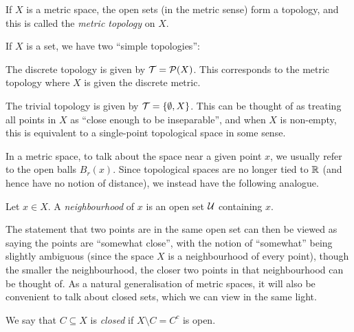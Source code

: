 \documentclass[11pt]{article}
\begin{document}
\begin{example}
    \begin{enum2}
        \item If $X$ is a metric space, the open sets (in the metric sense) form a topology, and this is called the \emph{metric topology} on $X$.
        \item If $X$ is a set, we have two ``simple topologies'':
        \begin{enum2}
            \item The discrete topology is given by $\mathcal{T} = \mathcal{P}(X)$. This corresponds to the metric topology where $X$ is given the discrete metric.
            \item The trivial topology is given by $\mathcal{T} = \left\{  \emptyset, X  \right\}$. This can be thought of as treating all points in $X$ as ``close enough to be inseparable'', and when $X$ is non-empty, this is equivalent to a single-point topological space in some sense.
        \end{enum2}
    \end{enum2}
\end{example}

In a metric space, to talk about the space near a given point $x$, we usually refer to the open balls $B_r(x)$. Since topological spaces are no longer tied to $\mathbb{R}$ (and hence have no notion of distance), we instead have the following analogue.
\begin{definition}[Neighbourhood]
    Let $x \in X$. A \emph{neighbourhood} of $x$ is an open set $\mathcal{U}$ containing $x$.
\end{definition}
The statement that two points are in the same open set can then be viewed as saying the points are ``somewhat close'', with the notion of ``somewhat'' being slightly ambiguous (since the space $X$ is a neighbourhood of every point), though the smaller the neighbourhood, the closer two points in that neighbourhood can be thought of. As a natural generalisation of metric spaces, it will also be convenient to talk about closed sets, which we can view in the same light.
\begin{definition}
    We say that $C \subseteq X$ is \emph{closed} if $X \setminus C = C^c$ is open.
\end{definition}
\end{document}

